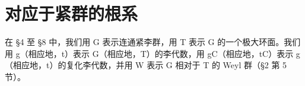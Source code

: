 \section{对应于紧群的根系}

在 §4 至 §8 中，我们用 G 表示连通紧李群，用 T 表示 G 的一个极大环面。我们用 g（相应地，t）表示 G（相应地，T）的李代数，用 gC（相应地，tC）表示 g（相应地，t）的复化李代数，并用 W 表示 G 相对于 T 的 Weyl 群（§2 第 5 节）。


